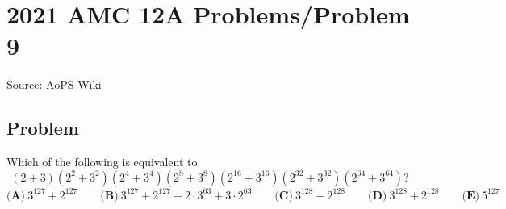 \documentclass[12pt]{article}
\begin{document}
\section*{{2021 AMC 12A Problems/Problem 9}}
Source: AoPS Wiki

\subsection*{Problem}
Which of the following is equivalent to \[(2+3)(2^2+3^2)(2^4+3^4)(2^8+3^8)(2^{16}+3^{16})(2^{32}+3^{32})(2^{64}+3^{64})?\] $\textbf{(A)} ~3^{127} + 2^{127} \qquad\textbf{(B)} ~3^{127} + 2^{127} + 2 \cdot 3^{63} + 3 \cdot 2^{63} \qquad\textbf{(C)} ~3^{128}-2^{128} \qquad\textbf{(D)} ~3^{128} + 2^{128} \qquad\textbf{(E)} ~5^{127}$
\end{document}
